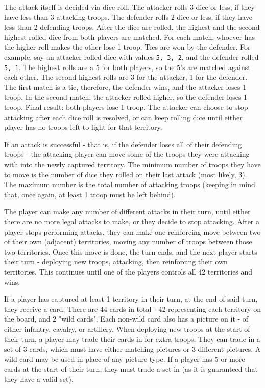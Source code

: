 The attack itself is decided via dice roll. The attacker rolls 3 dice or less, if they have less than 3 attacking troops. The defender rolls 2 dice or less, if they have less than 2 defending troops. After the dice are rolled, the highest and the second highest rolled dice from both players are matched. For each match, whoever has the higher roll makes the other lose 1 troop. Ties are won by the defender. For example, say an attacker rolled dice with values \texttt{5, 3, 2}, and the defender rolled \texttt{5, 1}. The highest rolls are a 5 for both players, so the 5's are matched against each other. The second highest rolls are 3 for the attacker, 1 for the defender. The first match is a tie, therefore, the defender wins, and the attacker loses 1 troop. In the second match, the attacker rolled higher, so the defender loses 1 troop. Final result: both players lose 1 troop. The attacker can choose to stop attacking after each dice roll is resolved, or can keep rolling dice until either player has no troops left to fight for that territory.

If an attack is successful - that is, if the defender loses all of their defending troops - the attacking player can move some of the troops they were attacking with into the newly captured territory. The minimum number of troops they have to move is the number of dice they rolled on their last attack (most likely, 3). The maximum number is the total number of attacking troops (keeping in mind that, once again, at least 1 troop must be left behind). 

The player can make any number of different attacks in their turn, until either there are no more legal attacks to make, or they decide to stop attacking. After a player stops performing attacks, they can make one reinforcing move between two of their own (adjacent) territories, moving any number of troops between those two territories. Once this move is done, the turn ends, and the next player starts their turn - deploying new troops, attacking, then reinforcing their own territories. This continues until one of the players controls all 42 territories and wins.

If a player has captured at least 1 territory in their turn, at the end of said turn, they receive a card. There are 44 cards in total - 42 representing each territory on the board, and 2 "wild cards". Each non-wild card also has a picture on it - of either infantry, cavalry, or artillery. When deploying new troops at the start of their turn, a player may trade their cards in for extra troops. They can trade in a set of 3 cards, which must have either matching pictures or 3 different pictures. A wild card may be used in place of any picture type. If a player has 5 or more cards at the start of their turn, they must trade a set in (as it is guaranteed that they have a valid set).

